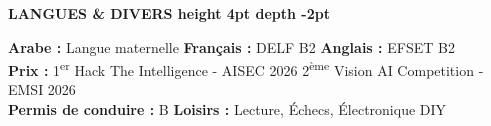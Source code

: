 \documentclass[10pt,a4paper]{../altacv}
\renewcommand{\cvsection}[2][]{%
  \medskip%
  {\color{heading}\LARGE\bfseries #2 \hspace{0.2em}\leaders\vrule height 4pt depth -2pt\hfill\mbox{}}\par\smallskip
}
\begin{document}
\cvsection{LANGUES \& DIVERS}
\textbf{Arabe :} Langue maternelle \hfill \textbf{Français :} DELF B2 \hfill \textbf{Anglais :} EFSET B2\\[2pt]
\textbf{Prix :} 1\textsuperscript{er} Hack The Intelligence - AISEC 2026 \hfill 2\textsuperscript{ème} Vision AI Competition - EMSI 2026\\[2pt]
\textbf{Permis de conduire :} B \hfill \textbf{Loisirs :} Lecture, Échecs, Électronique DIY
\end{document}
